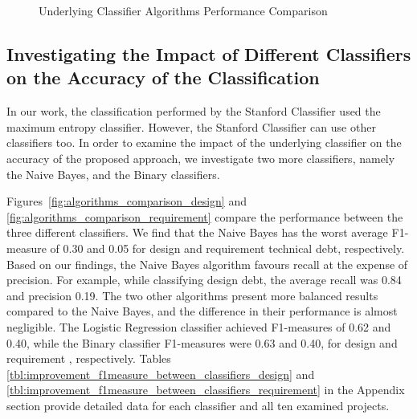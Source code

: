 \begin{figure}[!thb]
  \centering
  \caption{Underlying Classifier Algorithms Performance Comparison}
  \label{fig:algorithms_comparison}
\end{figure}

\subsection{Investigating the Impact of Different Classifiers on the Accuracy of the Classification}
\label{sec:underlying_classifier}
In our work, the classification performed by the Stanford Classifier used the maximum entropy classifier. However, the Stanford Classifier can use other classifiers too. In order to examine the impact of the underlying classifier on the accuracy of the proposed approach, we investigate two more classifiers, namely the Naive Bayes, and the Binary classifiers.
 
Figures~\ref{fig:algorithms_comparison_design} and \ref{fig:algorithms_comparison_requirement} compare the performance between the three different classifiers. We find that the Naive Bayes has the worst average F1-measure of 0.30 and 0.05 for design and requirement technical debt, respectively. Based on our findings, the Naive Bayes algorithm favours recall at the expense of precision. For example, while classifying design debt, the average recall was 0.84 and precision 0.19. The two other algorithms present more balanced results compared to the Naive Bayes, and the difference in their performance is almost negligible. The Logistic Regression classifier achieved F1-measures of 0.62 and 0.40, while the Binary classifier F1-measures were 0.63 and 0.40, for design and requirement \SATD, respectively. Tables \ref{tbl:improvement_f1measure_between_classifiers_design} and \ref{tbl:improvement_f1measure_between_classifiers_requirement} in the Appendix section provide detailed data for each classifier and all ten examined projects.


